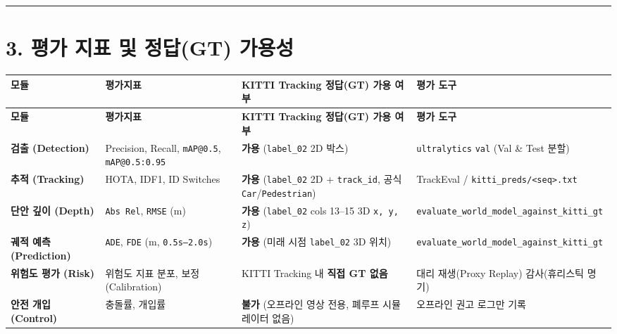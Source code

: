 \documentclass[10.5pt,a4paper]{article}
\begin{document}
\par\noindent\rule{\textwidth}{0.4pt}\par\medskip

\section{3. 평가 지표 및 정답(GT) 가용성}


\begin{footnotesize}
\setlength{\tabcolsep}{4pt}
\setlength{\LTleft}{0pt}\setlength{\LTright}{0pt}
\begin{longtable}{>{\raggedright\arraybackslash}p{} >{\raggedright\arraybackslash}p{} >{\raggedright\arraybackslash}p{} >{\raggedright\arraybackslash}p{}}
\toprule
\textbf{모듈} & \textbf{평가지표} & \textbf{KITTI Tracking 정답(GT) 가용 여부} & \textbf{평가 도구} \\
\midrule
\endfirsthead
\toprule
\textbf{모듈} & \textbf{평가지표} & \textbf{KITTI Tracking 정답(GT) 가용 여부} & \textbf{평가 도구} \\
\midrule
\endhead
\bottomrule
\endfoot
\textbf{검출 (Detection)} & Precision, Recall, \texttt{mAP@0.\allowbreak{}5}, \texttt{mAP@0.\allowbreak{}5:\allowbreak{}0.\allowbreak{}95} & \textbf{가용} (\texttt{label\_\allowbreak{}02} 2D 박스) & \texttt{ultralytics} \texttt{val} (Val \& Test 분할) \\
\textbf{추적 (Tracking)} & HOTA, IDF1, ID Switches & \textbf{가용} (\texttt{label\_\allowbreak{}02} 2D + \texttt{track\_\allowbreak{}id}, 공식 \texttt{Car}/\texttt{Pedestrian}) & TrackEval / \texttt{kitti\_\allowbreak{}preds/\allowbreak{}<seq>.\allowbreak{}txt} \\
\textbf{단안 깊이 (Depth)} & \texttt{Abs Rel}, \texttt{RMSE} (m) & \textbf{가용} (\texttt{label\_\allowbreak{}02} cols 13--15 3D \texttt{x,\allowbreak{} y,\allowbreak{} z}) & \texttt{evaluate\_\allowbreak{}world\_\allowbreak{}model\_\allowbreak{}against\_\allowbreak{}kitti\_\allowbreak{}gt} \\
\textbf{궤적 예측 (Prediction)} & \texttt{ADE}, \texttt{FDE} (m, \texttt{0.\allowbreak{}5s--2.\allowbreak{}0s}) & \textbf{가용} (미래 시점 \texttt{label\_\allowbreak{}02} 3D 위치) & \texttt{evaluate\_\allowbreak{}world\_\allowbreak{}model\_\allowbreak{}against\_\allowbreak{}kitti\_\allowbreak{}gt} \\
\textbf{위험도 평가 (Risk)} & 위험도 지표 분포, 보정(Calibration) & KITTI Tracking 내 \textbf{직접 GT 없음} & 대리 재생(Proxy Replay) 감사(휴리스틱 명기) \\
\textbf{안전 개입 (Control)} & 충돌률, 개입률 & \textbf{불가} (오프라인 영상 전용, 폐루프 시뮬레이터 없음) & 오프라인 권고 로그만 기록 \\
\end{longtable}
\end{footnotesize}
\end{document}
